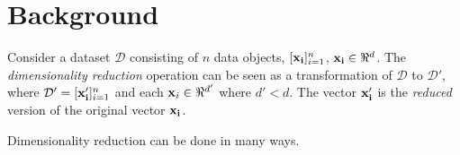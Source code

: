 \documentclass{article}
\begin{document}
\section{Background}
Consider a dataset $\mathcal{D}$ consisting of $n$ data objects, $[{\bf x_i}]_{i=1}^n$, ${\bf x_i} \in \Re^d$. The {\em dimensionality reduction} operation can be seen as a transformation of $\mathcal{D}$ to $\mathcal{D}'$, where $\mathcal{D'} = [{\bf x'_i}]_{i=1}^n$ and each ${\bf x}_i \in \Re^{d'}$ where $d' < d$. The vector ${\bf x'_i}$ is the {\em reduced} version of the original vector ${\bf x_i}$.

Dimensionality reduction can be done in many ways. 
\end{document}
